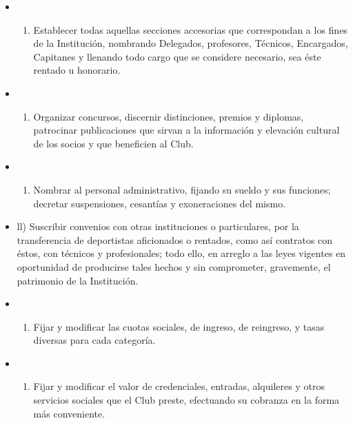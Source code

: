 \documentclass[openany]{book}
\providecommand{\tightlist}{%
  \setlength{\itemsep}{0pt}\setlength{\parskip}{0pt}}
\begin{document}
\begin{itemize}
\begin{itemize}
\begin{enumerate}
    \end{enumerate}
  \item
    \begin{enumerate}
    \def\labelenumi{\alph{enumi})}
    \setcounter{enumi}{9}
    \tightlist
    \item
      Establecer todas aquellas secciones accesorias que correspondan a los fines de la Institución, nombrando Delegados, profesores, Técnicos, Encargados, Capitanes y llenando todo cargo que se considere necesario, sea éste rentado u honorario.
    \end{enumerate}
  \item
    \begin{enumerate}
    \def\labelenumi{\alph{enumi})}
    \setcounter{enumi}{10}
    \tightlist
    \item
      Organizar concursos, discernir distinciones, premios y diplomas, patrocinar publicaciones que sirvan a la información y elevación cultural de los socios y que beneficien al Club.
    \end{enumerate}
  \item
    \begin{enumerate}
    \def\labelenumi{\alph{enumi})}
    \setcounter{enumi}{11}
    \tightlist
    \item
      Nombrar al personal administrativo, fijando su sueldo y sus funciones; decretar suspensiones, cesantías y exoneraciones del mismo.
    \end{enumerate}
  \item
    ll) Suscribir convenios con otras instituciones o particulares, por la transferencia de deportistas aficionados o rentados, como así contratos con éstos, con técnicos y profesionales; todo ello, en arreglo a las leyes vigentes en oportunidad de producirse tales hechos y sin comprometer, gravemente, el patrimonio de la Institución.
  \item
    \begin{enumerate}
    \def\labelenumi{\alph{enumi})}
    \setcounter{enumi}{12}
    \tightlist
    \item
      Fijar y modificar las cuotas sociales, de ingreso, de reingreso, y tasas diversas para cada categoría.
    \end{enumerate}
  \item
    \begin{enumerate}
    \def\labelenumi{\alph{enumi})}
    \setcounter{enumi}{13}
    \tightlist
    \item
      Fijar y modificar el valor de credenciales, entradas, alquileres y otros servicios sociales que el Club preste, efectuando su cobranza en la forma más conveniente.

\end{enumerate}
\end{itemize}
\end{itemize}
\end{document}

